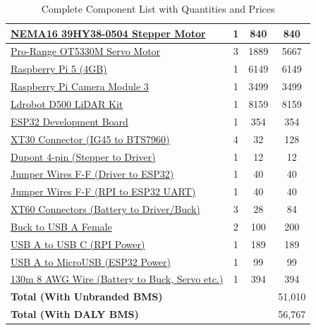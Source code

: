 \documentclass[12pt]{article}
\begin{document}
\begin{table}[!ht]
{\begin{tabular}{|l|c|c|c|}
\hline
\href{https://robu.in/product/nema16-39hy38-0504-2-9kg-cm-stepper-motor-round-type-shaft/}{NEMA16 39HY38-0504 Stepper Motor} & 1 & 840 & 840 \\
\hline
\href{https://robu.in/product/orange-ot5330m-7-4v-35-5kg-cm-180-metal-gear-digital-servo-motor/}{Pro-Range OT5330M Servo Motor} & 3 & 1889 & 5667 \\
\hline
\href{https://robocraze.com/products/raspberry-pi-5-4gb}{Raspberry Pi 5 (4GB)} & 1 & 6149 & 6149 \\
\hline
\href{https://robocraze.com/products/raspberry-pi-camera-module-3}{Raspberry Pi Camera Module 3} & 1 & 3499 & 3499 \\
\hline
\href{https://robu.in/product/ldrobot-dtof-lidar-stl-19p-360-omni-directional-lidar/}{Ldrobot D500 LiDAR Kit} & 1 & 8159 & 8159 \\
\hline
\href{https://robocraze.com/products/nodemcu-32-wifi-bluetooth-esp32-development-board30-pin?variant=42268194046176}{ESP32 Development Board} & 1 & 354 & 354 \\
\hline
\href{https://robocraze.com/product/amass-xt30upb30-female-connector-xt30upb-f30-g-y}{XT30 Connector (IG45 to BTS7960)} & 4 & 32 & 128 \\
\hline
\href{https://www.flyrobo.in/4p-1.25mm-single-head-dupont-terminal-wire}{Dupont 4-pin (Stepper to Driver)} & 1 & 12 & 12 \\
\hline
\href{https://robu.in/product/20cm-dupont-wire-color-jumper-cable-2-54mm-1p-1p-female-female-40pcs/}{Jumper Wires F-F (Driver to ESP32)} & 1 & 40 & 40 \\
\hline
\href{https://robu.in/product/20cm-dupont-wire-color-jumper-cable-2-54mm-1p-1p-female-female-40pcs/}{Jumper Wires F-F (RPI to ESP32 UART)} & 1 & 40 & 40 \\
\hline
\href{https://zbotic.in/product/xt60-male-female-connector-pair-for-lipo-battery/}{XT60 Connectors (Battery to Driver/Buck)} & 3 & 28 & 84 \\
\hline
\href{https://www.coolerguys.com/en-in/products/usb-female-a-to-bare-wire-30}{Buck to USB A Female} & 2 & 100 & 200 \\
\hline
\href{https://www.amazon.in/AmazonBasics-Braided-Charging-Cable-Smartphone/dp/B0BPCL2DXZ?th=1}{USB A to USB C (RPI Power)} & 1 & 189 & 189 \\
\hline
\href{https://www.amazon.in/amazon-basics-Braided-Charging-Transfer/dp/B0CH1499X7}{USB A to MicroUSB (ESP32 Power)} & 1 & 99 & 99 \\
\hline
\href{https://robu.in/product/high-quality-ultra-flexible-8awg-silicone-wire-black/}{130m 8 AWG Wire (Battery to Buck, Servo etc.)} & 1 & 394 & 394 \\
\hline
\textbf{Total (With Unbranded BMS)} & & & 51,010\\
\hline
\textbf{Total (With DALY BMS)} & & & 56,767\\
\hline
\end{tabular}
}
\caption{Complete Component List with Quantities and Prices}
\end{table}
\FloatBarrier
\end{document}
